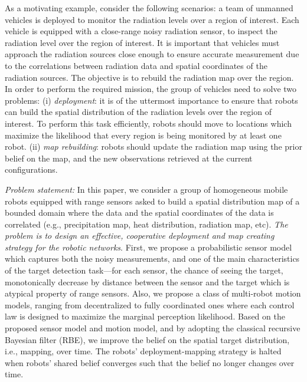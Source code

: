 \documentclass[journal]{IEEEtran}
\begin{document}
As a motivating example, consider the following scenarios: a team of unmanned vehicles is deployed to monitor the radiation levels over a region of interest. Each vehicle is equipped with a close-range noisy radiation sensor, to inspect the radiation level over the region of interest. It is important that vehicles must approach the radiation sources close enough to ensure accurate measurement due to the correlations between radiation data and spatial coordinates of the radiation sources. The objective is to rebuild the radiation map over the region.
In order to perform the required mission, the group of vehicles need to solve two problems: (i) \emph{deployment}: it is of the uttermost importance to ensure that robots can build the spatial distribution of the radiation levels over the region of interest. To perform this task efficiently, robots should move to locations which 
maximize the likelihood that every region is being monitored by at least one robot. 
(ii) \emph{map rebuilding}: robots should update the radiation map using the prior belief on the map, and the new observations retrieved at the current configurations. 

\textit{Problem statement:}
In this paper, we consider a group of homogeneous mobile robots equipped with range sensors asked to build a spatial distribution map of a bounded domain where the data and the spatial coordinates of the data is correlated (e.g., precipitation map, heat distribution, radiation map, etc). \emph{The problem is to design an effective, cooperative deployment and map creating strategy for the robotic networks}.
First, we propose a probabilistic sensor model which captures both the noisy measurements, and one of the main characteristics of the target detection task---for each sensor, the chance of seeing the target, monotonically decrease by distance between the sensor and the target which is atypical property of range sensors. 
Also, we propose a class of multi-robot motion models, ranging from decentralized to fully coordinated ones where each control law is designed to maximize the marginal perception likelihood. 
Based on the proposed sensor model and motion model, and by adopting the classical recursive Bayesian filter (RBE), we improve the belief on the spatial target distribution, i.e., mapping, over time. The robots' deployment-mapping strategy is halted when robots' shared belief converges such that the belief no longer changes over time.
%
\end{document}
